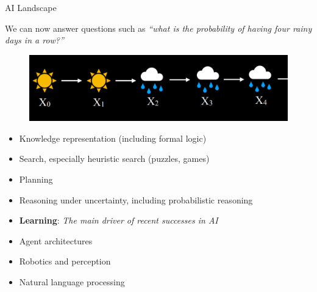 \documentclass{beamer}
\begin{document}
\begin{frame}[allowframebreaks]{AI Landscape}
\begin{figure}
\end{figure}
We can now answer questions such as \textit{“what is the probability of having four rainy days in a row?”}
\begin{figure}
\centering
\captionsetup{justification=centering}
\includegraphics[scale=0.30]{markovchain.png}
\end{figure}
\framebreak
\begin{itemize}
\item Knowledge representation (including formal logic)
\item Search, especially heuristic search (puzzles, games)
\item Planning
\item Reasoning under uncertainty, including probabilistic reasoning
\item \textbf{Learning}: \textit{The main driver of recent successes in AI}
\item Agent architectures
\item Robotics and perception
\item Natural language processing
\end{itemize}
\end{frame}
\end{document}
